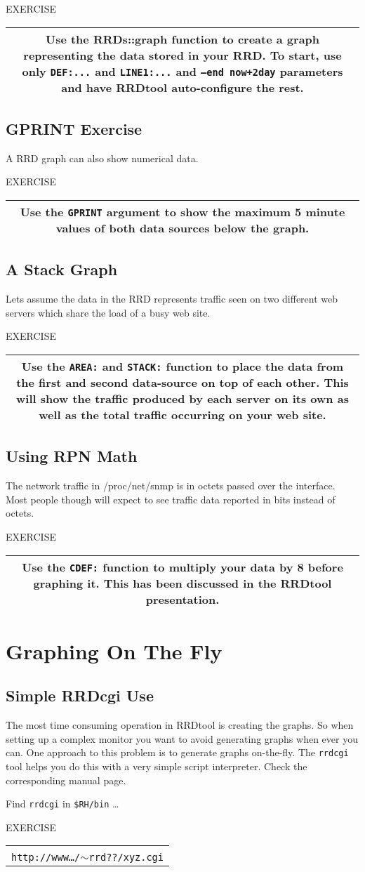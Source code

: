 \documentclass[a4paper,12pt]{article}
\newenvironment{work}{\textsf{\tiny EXERCISE}\nopagebreak\\[0.3ex]\begin{tabular}{|c|}
 \hline
 \begin{minipage}{0.965\linewidth}%
 \setlength{\parskip}{1.6ex plus 0.6ex minus 0.4ex}%
 \rule{0pt}{2.8ex}\ignorespaces}
{\rule[-1.8ex]{0pt}{0pt}\end{minipage}\\
 \hline
 \end{tabular}}
\newcommand{\ex}[1]{\subsection{#1}}
\newcommand{\cmd}[1]{\texttt{\mbox{#1}}}
\newcommand\ti{$\sim$}   %
\begin{document}
\begin{work}
Use the RRDs::graph function to create a graph representing the data
stored in your RRD. To start, use only \cmd{DEF:...} and \cmd{LINE1:...}
and \cmd{--end now+2day} parameters and have RRDtool
auto-configure the rest. 
\end{work}

\ex{GPRINT Exercise}
A RRD graph can also show numerical data.

\begin{work}
  Use the \cmd{GPRINT} argument to show the maximum 5 minute values of
  both data sources below the graph.
\end{work}

\ex{A Stack Graph}
Lets assume the data in the RRD represents traffic seen on two
different web servers which share the load of a busy web site.

\begin{work}
  Use the \cmd{AREA:} and \cmd{STACK:} function to place the data from
  the first and second data-source on top of each other. This will
  show the traffic produced by each server on its own as well as the
  total traffic occurring on your web site.
\end{work}

\ex{Using RPN Math}

The network traffic in /proc/net/snmp is in octets passed over the
interface. Most people though will expect to see traffic data reported in
bits instead of octets.

\begin{work}
Use the \cmd{CDEF:} function to multiply your data by 8
before graphing it. This has been discussed in the RRDtool
presentation.
\end{work}

\newpage
\section{Graphing On The Fly}
\ex{Simple RRDcgi Use} 

The most time consuming operation in RRDtool is creating the graphs.
So when setting up a complex monitor you want to avoid generating
graphs when ever you can. One approach to this problem is to generate
graphs on-the-fly. The \cmd{rrdcgi} tool helps you do this with a very
simple script interpreter. Check the corresponding manual page.

Find \cmd{rrdcgi} in \cmd{\$RH/bin} \ldots

\begin{work}
  Write a \cmd{rrdcgi} input file which generates the stacked graph
  you did in the last example. Check the effect of the \texttt{--lazy}
  option. You can test your input file by putting it into 
  \cmd{public\_html/xyz.cgi} and then calling\\
  \cmd{http://www\ldots/\ti rrd??/xyz.cgi}
\end{work}
\end{document}
